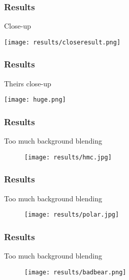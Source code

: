 \documentclass{beamer}
\theoremstyle{remark}
\begin{document}
\begin{frame}[t]
 \frametitle{Results}
\begin{block}{Close-up}
 
\begin{center}
 \texttt{[image: results/closeresult.png]}
\end{center}
\end{block}
\end{frame}

\begin{frame}[t]
\frametitle{Results}
\begin{block}{Theirs close-up}
\begin{center}
\texttt{[image: huge.png]} 
\end{center}
\end{block}
\end{frame}

\begin{frame}[t]
 \frametitle{Results}
 
\begin{block}{Too much background blending}
 \begin{figure} 
\begin{center}
\texttt{[image: results/hmc.jpg]}
\end{center}
\end{figure}
\end{block}
\end{frame}

\begin{frame}[t]
 \frametitle{Results}
 
\begin{block}{Too much background blending}
 \begin{figure} 
\begin{center}
\texttt{[image: results/polar.jpg]}
\end{center}
\end{figure}
\end{block}
\end{frame}

\begin{frame}[t]
 \frametitle{Results}
\begin{block}{Too much background blending}
 \begin{figure} 
\begin{center}
\texttt{[image: results/badbear.png]}
\end{center}
\end{figure}
\end{block}
\end{frame}
\end{document}
